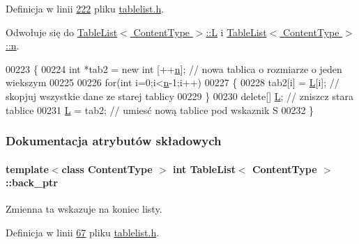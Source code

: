 Definicja w linii \hyperlink{tablelist_8h_source_l00222}{222} pliku \hyperlink{tablelist_8h_source}{tablelist.\-h}.



Odwołuje się do \hyperlink{tablelist_8h_source_l00081}{Table\-List$<$ Content\-Type $>$\-::\-L} i \hyperlink{tablelist_8h_source_l00053}{Table\-List$<$ Content\-Type $>$\-::n}.


\begin{DoxyCode}
00223     \{
00224         \textcolor{keywordtype}{int} *tab2 = \textcolor{keyword}{new} \textcolor{keywordtype}{int} [++\hyperlink{class_table_list_af60a60e1c22ab2e6f3745d5c1b5c1c1e}{n}];                     \textcolor{comment}{// nowa tablica o rozmiarze o jeden wiekszym}
00225 
00226         \textcolor{keywordflow}{for}(\textcolor{keywordtype}{int} i=0;i<\hyperlink{class_table_list_af60a60e1c22ab2e6f3745d5c1b5c1c1e}{n}-1;i++)
00227         \{
00228                 tab2[i] = \hyperlink{class_table_list_a18c24d5cce01d71624b04434ad4e5b91}{L}[i];                                \textcolor{comment}{// skopjuj wszystkie dane ze starej tablicy}
00229         \}
00230         \textcolor{keyword}{delete}[] \hyperlink{class_table_list_a18c24d5cce01d71624b04434ad4e5b91}{L};                                            \textcolor{comment}{// zniszcz stara tablice}
00231         \hyperlink{class_table_list_a18c24d5cce01d71624b04434ad4e5b91}{L} = tab2;                                              \textcolor{comment}{// umiesć nową tablice pod wskaznik S}
00232     \}
\end{DoxyCode}


\subsubsection{Dokumentacja atrybutów składowych}
\hypertarget{class_table_list_a7b74b24a81ee8ea30844fbca7b52c131}{
\paragraph[{back\-\_\-ptr}]{\setlength{\rightskip}{0pt plus 5cm}template$<$class Content\-Type $>$ int {\bf Table\-List}$<$ Content\-Type $>$\-::back\-\_\-ptr}}\label{class_table_list_a7b74b24a81ee8ea30844fbca7b52c131}
Zmienna ta wskazuje na koniec listy. 

Definicja w linii \hyperlink{tablelist_8h_source_l00067}{67} pliku \hyperlink{tablelist_8h_source}{tablelist.\-h}.



